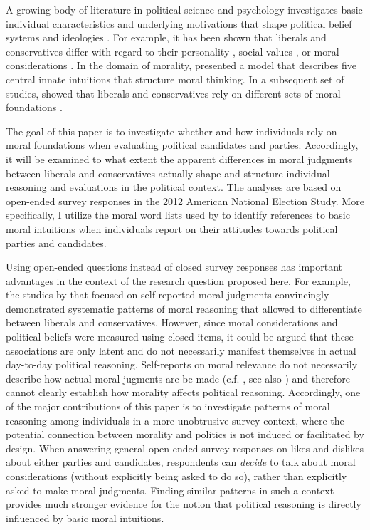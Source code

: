 \documentclass[12pt]{article}
\begin{document}
A growing body of literature in political science and psychology investigates basic individual characteristics and underlying motivations that shape political belief systems and ideologies \citep[c.f.][]{jost2003political,jost2006end,jost2009political}. For example, it has been shown that liberals and conservatives differ with regard to their personality \citep{gerber2010personality,hirsh2010compassionate,de2013personality}, social values \citep{schwartz2010basic,schwartz2011basic,piurko2011basic}, or moral considerations \citep{lakoff1995metaphor,haidt2008moral,mcadams2008family}. In the domain of morality, \citet{haidt2008moral} presented a model that describes five central innate intuitions that structure moral thinking. In a subsequent set of studies, \citet{graham2009liberals} showed that liberals and conservatives rely on different sets of moral foundations \citep[see also][]{haidt2007morality}.

The goal of this paper is to investigate whether and how individuals rely on moral foundations when evaluating political candidates and parties. Accordingly, it will be examined to what extent the apparent differences in moral judgments between liberals and conservatives actually shape and structure individual reasoning and evaluations in the political context. The analyses are based on open-ended survey responses in the 2012 American National Election Study. More specifically, I utilize the moral word lists used by \citet{graham2009liberals} to identify references to basic moral intuitions when individuals report on their attitudes towards political parties and candidates.

Using open-ended questions instead of closed survey responses has important advantages in the context of the research question proposed here. For example, the studies by \citet{graham2009liberals} that focused on self-reported moral judgments convincingly demonstrated systematic patterns of moral reasoning that allowed to differentiate between liberals and conservatives. However, since moral considerations and political beliefs were measured using closed items, it could be argued that these associations are only latent and do not necessarily manifest themselves in actual day-to-day political reasoning. Self-reports on moral relevance do not necessarily describe how actual moral jugments are be made (c.f. \citealt[1031]{graham2009liberals}, see also \citealt{clifford2015moral}) and therefore cannot clearly establish how morality affects political reasoning. Accordingly, one of the major contributions of this paper is to investigate patterns of moral reasoning among individuals in a more unobtrusive survey context, where the potential connection between morality and politics is not induced or facilitated by design. When answering general open-ended survey responses on likes and dislikes about either parties and candidates, respondents can \textit{decide} to talk about moral considerations (without explicitly being asked to do so), rather than explicitly asked to make moral judgments. Finding similar patterns in such a context provides much stronger evidence for the notion that political reasoning is directly influenced by basic moral intuitions.
\end{document}
